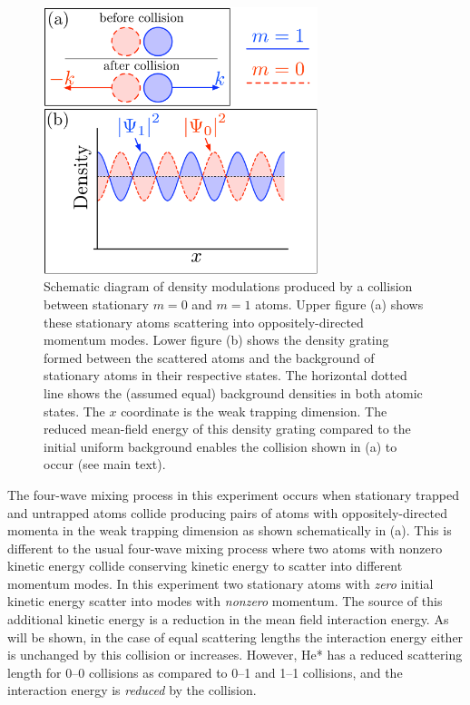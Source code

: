 \begin{figure}
    \begin{center}
        \includegraphics[width=8cm]{CollisionDiagram}
        \caption{Schematic diagram of density modulations produced by a collision
                 between stationary $m=0$ and $m=1$ atoms. Upper figure (a)
                 shows these stationary atoms scattering into oppositely-directed
                 momentum modes. Lower figure (b) shows the density grating formed
                 between the scattered atoms and the background of stationary atoms
                 in their respective states. The horizontal dotted line shows the
                 (assumed equal) background densities in both atomic states. The $x$
                 coordinate is the weak trapping dimension. The reduced mean-field
                 energy of this density grating compared to the initial uniform
                 background enables the collision shown in (a) to occur (see main
                 text).
                 \label{Peaks:CollisionDiagram}}
    \end{center}
\end{figure}

The four-wave mixing process in this experiment occurs when stationary trapped and untrapped atoms collide producing pairs of atoms with oppositely-directed momenta in the weak trapping dimension as shown schematically in (a). This is different to the usual four-wave mixing process where two atoms with nonzero kinetic energy collide conserving kinetic energy to scatter into different momentum modes. In this experiment two stationary atoms with \emph{zero} initial kinetic energy scatter into modes with \emph{nonzero} momentum. The source of this additional kinetic energy is  a reduction in the mean field interaction energy. As will be shown, in the case of equal scattering lengths the interaction energy either is unchanged by this collision or increases. However, He* has a reduced scattering length for 0--0 collisions as compared to 0--1 and 1--1 collisions, and the interaction energy is \emph{reduced} by the collision.

